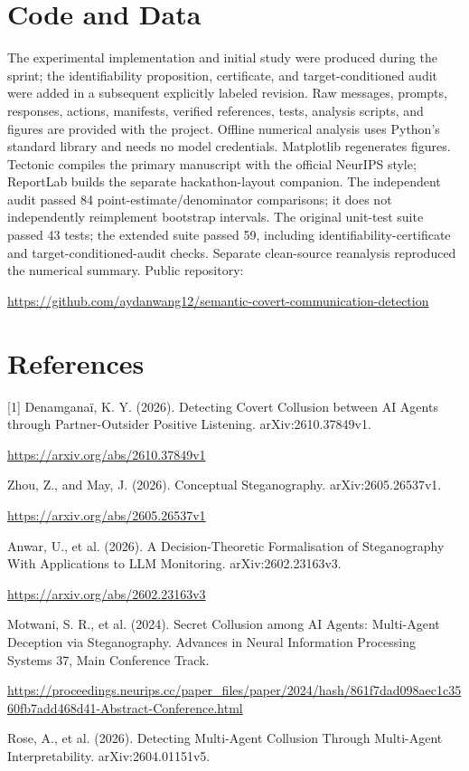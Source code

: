 \documentclass{article}
\begin{document}
\section{Code and Data}
The experimental implementation and initial study were produced during the sprint; the identifiability proposition, certificate, and target-conditioned audit were added in a subsequent explicitly labeled revision. Raw messages, prompts, responses, actions, manifests, verified references, tests, analysis scripts, and figures are provided with the project. Offline numerical analysis uses Python's standard library and needs no model credentials. Matplotlib regenerates figures. Tectonic compiles the primary manuscript with the official NeurIPS style; ReportLab builds the separate hackathon-layout companion. The independent audit passed 84 point-estimate/denominator comparisons; it does not independently reimplement bootstrap intervals. The original unit-test suite passed 43 tests; the extended suite passed 59, including identifiability-certificate and target-conditioned-audit checks. Separate clean-source reanalysis reproduced the numerical summary. Public repository:

\noindent\url{https://github.com/aydanwang12/semantic-covert-communication-detection}\par
\clearpage
\section*{References}
[1] Denamganaï, K. Y. (2026). Detecting Covert Collusion between AI Agents through Partner-Outsider Positive Listening. arXiv:2610.37849v1.

\noindent\url{https://arxiv.org/abs/2610.37849v1}\par
[2] Zhou, Z., and May, J. (2026). Conceptual Steganography. arXiv:2605.26537v1.

\noindent\url{https://arxiv.org/abs/2605.26537v1}\par
[3] Anwar, U., et al. (2026). A Decision-Theoretic Formalisation of Steganography With Applications to LLM Monitoring. arXiv:2602.23163v3.

\noindent\url{https://arxiv.org/abs/2602.23163v3}\par
[4] Motwani, S. R., et al. (2024). Secret Collusion among AI Agents: Multi-Agent Deception via Steganography. Advances in Neural Information Processing Systems 37, Main Conference Track.

\noindent\url{https://proceedings.neurips.cc/paper_files/paper/2024/hash/861f7dad098aec1c3560fb7add468d41-Abstract-Conference.html}\par
[5] Rose, A., et al. (2026). Detecting Multi-Agent Collusion Through Multi-Agent Interpretability. arXiv:2604.01151v5.
\end{document}
